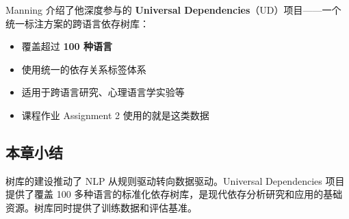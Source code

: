 Manning 介绍了他深度参与的 \textbf{Universal Dependencies}（UD）项目——一个统一标注方案的跨语言依存树库：

\begin{itemize}
    \item 覆盖超过 \textbf{100 种语言}
    \item 使用统一的依存关系标签体系
    \item 适用于跨语言研究、心理语言学实验等
    \item 课程作业 Assignment 2 使用的就是这类数据
\end{itemize}

\subsection{本章小结}

树库的建设推动了 NLP 从规则驱动转向数据驱动。Universal Dependencies 项目提供了覆盖 100 多种语言的标准化依存树库，是现代依存分析研究和应用的基础资源。树库同时提供了训练数据和评估基准。


